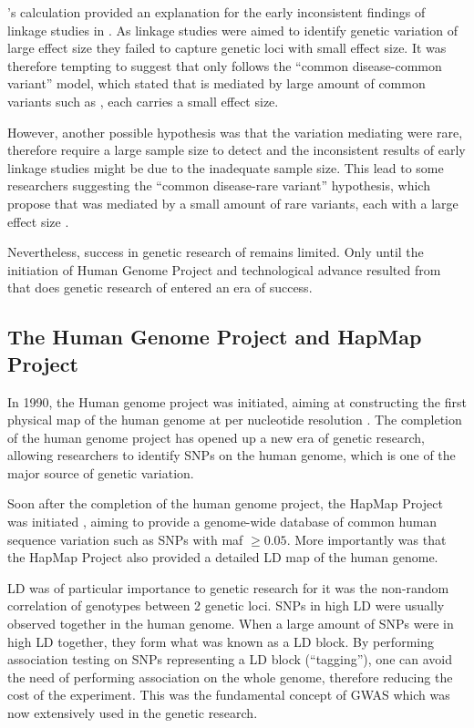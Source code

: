 	\citet{Risch1990a}'s calculation provided an explanation for the early inconsistent findings of linkage studies in  \citep{Harrison2005}.
	As linkage studies were aimed to identify genetic variation of large effect size they failed to capture genetic loci with small effect size.
	It was therefore tempting to suggest that  only follows the ``common disease-common variant'' model, which stated that  is mediated by large amount of common variants such as , each carries a small effect size.
	
	However, another possible hypothesis was that the variation mediating  were rare, therefore require a large sample size to detect and the inconsistent results of early linkage studies might be due to the inadequate sample size. 
	This lead to some researchers suggesting the ``common disease-rare variant'' hypothesis, which propose that  was mediated by a small amount of rare variants, each with a large effect size \citep{McClellan2007}.
	
	Nevertheless, success in genetic research of  remains limited.
	Only until the initiation of Human Genome Project and technological advance resulted from that does genetic research of  entered an era of success.

	\subsection{The Human Genome Project and HapMap Project}
	In 1990, the Human genome project was initiated, aiming at constructing the first physical map of the human genome at per nucleotide resolution \citep{Lander2001}.
	The completion of the human genome project has opened up a new era of genetic research, allowing researchers to identify \glspl{SNP} on the human genome, which is one of the major source of genetic variation.
	
	Soon after the completion of the human genome project, the HapMap Project was initiated \citep{Consortium2005}, aiming to provide a genome-wide database of common human sequence variation such as \glspl{SNP} with \gls{maf} $\ge0.05$.
	More importantly was that the HapMap Project also provided a detailed \gls{LD} map of the human genome.
	
	\gls{LD} was of particular importance to genetic research for it was the non-random correlation of genotypes between 2 genetic loci. 
	\glspl{SNP} in high \gls{LD} were usually observed together in the human genome.
	When a large amount of \glspl{SNP} were in high \gls{LD} together, they form what was known as a \gls{LD} block.
	By performing association testing on \glspl{SNP} representing a \gls{LD} block (``tagging''), one can avoid the need of performing association on the whole genome, therefore reducing the cost of the experiment.
	This was the fundamental concept of \gls{GWAS} which was now extensively used in the genetic research.
	
